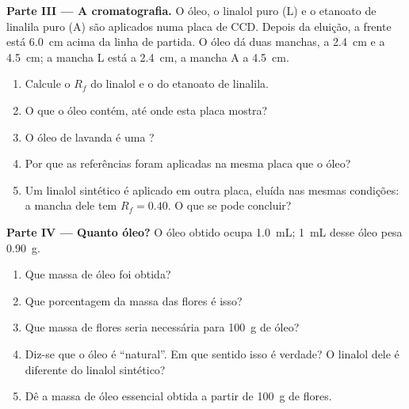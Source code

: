 \begin{problem}
\medskip
\noindent\textbf{Parte III --- A cromatografia.}
O óleo, o linalol puro (L) e o etanoato de linalila puro (A) são
aplicados numa placa de CCD. Depois da eluição, a frente está
\qty{6.0}{cm} acima da linha de partida. O óleo dá duas manchas, a
\qty{2.4}{cm} e a \qty{4.5}{cm}; a mancha L está a \qty{2.4}{cm}, a
mancha A a \qty{4.5}{cm}.
\begin{enumerate}[resume]
  \item Calcule o $R_f$ do linalol e o do etanoato de linalila.
  \item O que o óleo contém, até onde esta placa mostra?
  \item O óleo de lavanda é uma ?
  \item Por que as referências foram aplicadas na mesma placa que o óleo?
  \item Um linalol sintético é aplicado em outra placa, eluída nas mesmas
        condições: a mancha dele tem $R_f = 0.40$. O que se pode
        concluir?
\end{enumerate}

\medskip
\noindent\textbf{Parte IV --- Quanto óleo?}
O óleo obtido ocupa \qty{1.0}{mL}; \qty{1}{mL} desse óleo pesa
\qty{0.90}{g}.
\begin{enumerate}[resume]
  \item Que massa de óleo foi obtida?
  \item Que porcentagem da massa das flores é isso?
  \item Que massa de flores seria necessária para \qty{100}{g} de óleo?
  \item Diz-se que o óleo é ``natural''. Em que sentido isso é verdade? O
        linalol dele é diferente do linalol sintético?
  \item Dê a massa de óleo essencial obtida a partir de \qty{100}{g} de
        flores.
\end{enumerate}
\end{problem}
